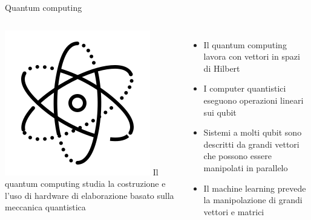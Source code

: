 \documentclass{beamer}
\begin{document}
    \begin{frame}{Quantum computing}
        \begin{columns}
            \includegraphics[width=\textwidth]{gfx/icons/icons8-physics-240.png}
            Il quantum computing studia la costruzione e l'uso di hardware di elaborazione basato sulla meccanica quantistica
            \begin{itemize}
                \item Il quantum computing lavora con vettori in spazi di Hilbert
                \item I computer quantistici eseguono operazioni lineari sui qubit
                \item Sistemi a molti qubit sono descritti da grandi vettori che possono essere manipolati in parallelo
                \item Il machine learning prevede la manipolazione di grandi vettori e matrici
            \end{itemize}
        \end{columns}
    \end{frame}
\end{document}

